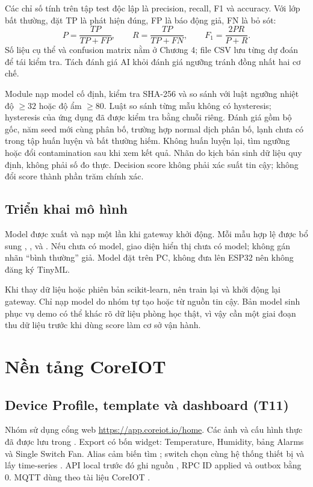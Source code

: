 Các chỉ số tính trên tập test độc lập là precision, recall, F1 và accuracy. Với lớp bất thường, đặt TP là phát hiện đúng, FP là báo động giả, FN là bỏ sót:
\[
P=\frac{TP}{TP+FP},\qquad R=\frac{TP}{TP+FN},\qquad
F_1=\frac{2PR}{P+R}.
\]
Số liệu cụ thể và confusion matrix nằm ở Chương 4; file CSV lưu từng dự đoán để tái kiểm tra. Tách đánh giá AI khỏi đánh giá ngưỡng tránh đồng nhất hai cơ chế.

Module  nạp model cố định, kiểm tra SHA-256 và so sánh với luật ngưỡng nhiệt độ $\geq32$ hoặc độ ẩm $\geq80$. Luật so sánh từng mẫu không có hysteresis; hysteresis của ứng dụng đã được kiểm tra bằng chuỗi riêng. Đánh giá gồm bộ gốc, năm seed mới cùng phân bố, trường hợp normal dịch phân bố, lạnh chưa có trong tập huấn luyện và bất thường hiếm. Không huấn luyện lại, tìm ngưỡng hoặc đổi contamination sau khi xem kết quả. Nhãn do kịch bản sinh dữ liệu quy định, không phải số đo thực. Decision score không phải xác suất tin cậy; không đổi score thành phần trăm chính xác.

\subsection{Triển khai mô hình}
Model được xuất  và nạp một lần khi gateway khởi động. Mỗi mẫu hợp lệ được bổ sung , ,  và . Nếu chưa có model, giao diện hiển thị chưa có model; không gán nhãn ``bình thường'' giả. Model đặt trên PC, không đưa lên ESP32 nên không đăng ký TinyML.

Khi thay dữ liệu hoặc phiên bản scikit-learn, nên train lại và khởi động lại gateway. Chỉ nạp model do nhóm tự tạo hoặc từ nguồn tin cậy. Bản model sinh phục vụ demo có thể khác rõ dữ liệu phòng học thật, vì vậy cần một giai đoạn thu dữ liệu trước khi dùng score làm cơ sở vận hành.

\section{Nền tảng CoreIOT}
\subsection{Device Profile, template và dashboard (T11)}
Nhóm sử dụng cổng web \url{https://app.coreiot.io/home}. Các ảnh và cấu hình thực đã được lưu trong . Export  có bốn widget: Temperature, Humidity, bảng Alarms và Single Switch Fan. Alias cảm biến tìm ; switch chọn cùng hệ thống thiết bị và lấy time-series . API local trước đó ghi nguồn , RPC ID applied và outbox bằng 0. MQTT dùng  theo tài liệu CoreIOT \cite{coreiotconnect}.

